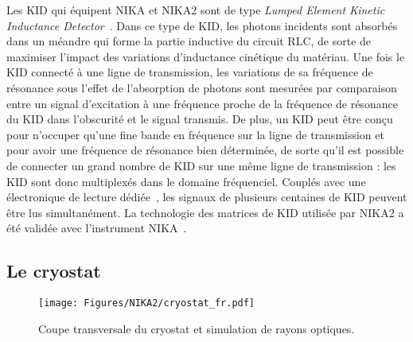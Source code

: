 Les KID qui équipent NIKA et NIKA2 sont
de type \emph{Lumped Element Kinetic Inductance
  Detector}~\citep{Doyle2008_LEKID,Roesch2012_LEKID}. Dans
ce type de KID, les photons incidents sont absorbés dans un méandre
qui forme la partie inductive du circuit RLC, de sorte de maximiser
l'impact des variations d'inductance cinétique du matériau.   
Une fois le KID connecté à une ligne de transmission, les variations
de sa fréquence de résonance sous l'effet de l'absorption de photons
sont mesurées par comparaison entre un signal d'excitation à
une fréquence proche de la fréquence de résonance du KID dans
l'obscurité et le signal transmis. 
De plus, un KID peut être conçu
pour n'occuper qu'une fine bande en fréquence sur la ligne de
transmission et pour avoir une fréquence de résonance bien déterminée,
de sorte qu'il est possible de connecter un grand nombre de KID sur
une même ligne de transmission : les KID sont donc multiplexés dans le
domaine fréquenciel. Couplés avec une électronique de lecture
dédiée~\citep{Bourrion2016}, les signaux de plusieurs centaines de KID
peuvent être lus simultanément. 
La technologie des matrices de KID utilisée par NIKA2 a été validée
avec l'instrument
NIKA~\citep{Monfardini2010_NIKA, Monfardini2011_NIKA, Roesch2012_LEKID, Calvo2013}.



\subsection{Le cryostat}
   
\begin{figure}[ht!] 
\begin{center}
\texttt{[image: Figures/NIKA2/cryostat\_fr.pdf]}
\caption[Coupe transversale du cryostat]{Coupe transversale du
  cryostat et simulation de rayons optiques.} 
 \label{fig:cryostat}
\end{center}
\end{figure}

